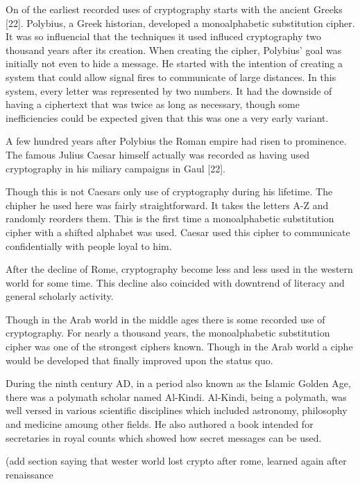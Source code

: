 \documentclass{article}
\begin{document}
    On of the earliest recorded uses of cryptography starts with the ancient Greeks [22].
    Polybius, a Greek historian, developed a monoalphabetic substitution cipher. It
    was so influencial that the techniques it used influced cryptography two thousand
    years after its creation.
    When creating the cipher, Polybius' goal was initially not even to hide a message.
    He started with the intention of creating a system that could allow signal fires
    to communicate of large distances. In this system, every letter was represented
    by two numbers. It had the downside of having a ciphertext that was twice as long
    as necessary, though some inefficiencies could be expected given that this
    was one a very early variant.

    A few hundred years after Polybius the Roman empire had risen to prominence.
    The famous Julius Caesar himself actually was recorded as having used cryptography
    in his miliary campaigns in Gaul [22].

    Though this is not Caesars only use of cryptography during his lifetime.
    The chipher he used here was fairly straightforward. It takes the letters A-Z
    and randomly reorders them. This is the first time a monoalphabetic substitution
    cipher with a shifted alphabet was used.
    Caesar used this cipher to communicate confidentially with people loyal to him.

    After the decline of Rome, cryptography become less and less used in the western
    world for some time.
    This decline also coincided with downtrend of literacy and general scholarly activity.

    Though in the Arab world in the middle ages there is some recorded use of cryptography.
    For nearly a thousand years, the monoalphabetic substitution cipher was one
    of the strongest ciphers known. Though in the Arab world a ciphe would be developed
    that finally improved upon the status quo.

    During the ninth century AD, in a period also known as the Islamic Golden Age,
    there was a polymath scholar named Al-Kindi. Al-Kindi, being a polymath, was
    well versed in various scientific disciplines which included astronomy, philosophy
    and medicine amoung other fields. He also authored a book intended for
    secretaries in royal counts which showed how secret messages can be used. 

    (add section saying that wester world lost crypto after rome, learned again
    after renaissance
    
\end{document}
